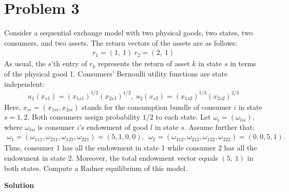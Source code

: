 \documentclass[a4paper]{article}
\begin{document}
\section*{Problem 3}
Consider a sequential exchange model with two physical goods, two states, two consumers, and two assets. The return vectors of the assets are as follows:
\begin{align*}
r_1 = (1,\ 1)\ r_2 = (2,\ 1)
\end{align*}
As usual, the $s$’th entry of $r_k$ represents the return of asset $k$ in state $s$ in terms of the
physical good 1.
Consumers’ Bernoulli utility functions are state independent:
\begin{align*}
u_1(x_{s1}) = (x_{1s1})^{1/2}(x_{2s1})^{1/2},\ 
u_2(x_{s2}) = (x_{1s2})^{1/3}(x_{2s2})^{2/3}
\end{align*}
Here, $x_{si} = (x_{1si}, x_{2si})$ stands for the consumption bundle of consumer $i$ in state $s = 1, 2$.
Both consumers assign probability $1/2$ to each state.
Let $\omega_i = (\omega_{lsi})$, where $\omega_{lsi}$ is consumer $i$’s endowment of good $l$ in state $s$. Assume
further that:
\begin{align*}
\omega_1 = (\omega_{111}, \omega_{211}, \omega_{121}, \omega_{221}) = (5, 1, 0, 0),\ \ \omega_2 = (\omega_{112}, \omega_{212}, \omega_{122}, \omega_{222}) = (0, 0, 5, 1).
\end{align*}
Thus, consumer 1 has all the endowment in state 1 while consumer 2 has all the endowment
in state 2. Moreover, the total endowment vector equals $(5,\ 1)$ in both states.
Compute a Radner equilibrium of this model.


\textbf{Solution}
\end{document}
